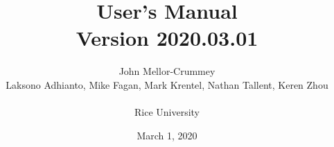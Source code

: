 \documentclass[11pt,letterpaper]{report}
\begin{document}

\title{\HPCToolkit{} User's Manual\\[.5in]Version 2020.03.01}

\author{
John Mellor-Crummey\\
Laksono Adhianto,
Mike Fagan,
Mark Krentel,
Nathan Tallent, Keren Zhou\\
\\
Rice University\\
}

\date{March 1, 2020}

\maketitle



\setcounter{page}{1}







\begin{singlespace}

\newpage

\pagestyle{empty}
\thispagestyle{empty}
\tableofcontents



\end{singlespace}
\end{document}
